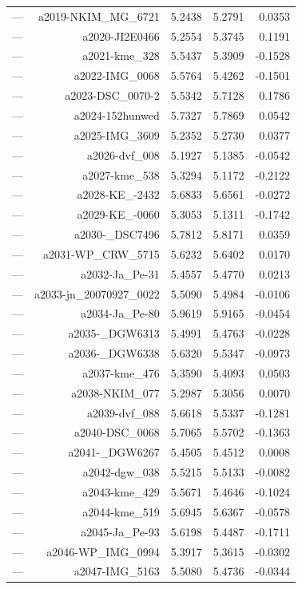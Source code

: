 \begin{table}[htbp]
\begin{tabular}{lrrrr}
— & a2019-NKIM_MG_6721 & 5.2438 & 5.2791 & 0.0353 \\
— & a2020-JI2E0466 & 5.2554 & 5.3745 & 0.1191 \\
— & a2021-kme_328 & 5.5437 & 5.3909 & -0.1528 \\
— & a2022-IMG_0068 & 5.5764 & 5.4262 & -0.1501 \\
— & a2023-DSC_0070-2 & 5.5342 & 5.7128 & 0.1786 \\
— & a2024-152hunwed & 5.7327 & 5.7869 & 0.0542 \\
— & a2025-IMG_3609 & 5.2352 & 5.2730 & 0.0377 \\
— & a2026-dvf_008 & 5.1927 & 5.1385 & -0.0542 \\
— & a2027-kme_538 & 5.3294 & 5.1172 & -0.2122 \\
— & a2028-KE_-2432 & 5.6833 & 5.6561 & -0.0272 \\
— & a2029-KE_-0060 & 5.3053 & 5.1311 & -0.1742 \\
— & a2030-_DSC7496 & 5.7812 & 5.8171 & 0.0359 \\
— & a2031-WP_CRW_5715 & 5.6232 & 5.6402 & 0.0170 \\
— & a2032-Ja_Pe-31 & 5.4557 & 5.4770 & 0.0213 \\
— & a2033-jn_20070927_0022 & 5.5090 & 5.4984 & -0.0106 \\
— & a2034-Ja_Pe-80 & 5.9619 & 5.9165 & -0.0454 \\
— & a2035-_DGW6313 & 5.4991 & 5.4763 & -0.0228 \\
— & a2036-_DGW6338 & 5.6320 & 5.5347 & -0.0973 \\
— & a2037-kme_476 & 5.3590 & 5.4093 & 0.0503 \\
— & a2038-NKIM_077 & 5.2987 & 5.3056 & 0.0070 \\
— & a2039-dvf_088 & 5.6618 & 5.5337 & -0.1281 \\
— & a2040-DSC_0068 & 5.7065 & 5.5702 & -0.1363 \\
— & a2041-_DGW6267 & 5.4505 & 5.4512 & 0.0008 \\
— & a2042-dgw_038 & 5.5215 & 5.5133 & -0.0082 \\
— & a2043-kme_429 & 5.5671 & 5.4646 & -0.1024 \\
— & a2044-kme_519 & 5.6945 & 5.6367 & -0.0578 \\
— & a2045-Ja_Pe-93 & 5.6198 & 5.4487 & -0.1711 \\
— & a2046-WP_IMG_0994 & 5.3917 & 5.3615 & -0.0302 \\
— & a2047-IMG_5163 & 5.5080 & 5.4736 & -0.0344 \\

\end{tabular}
\end{table}
